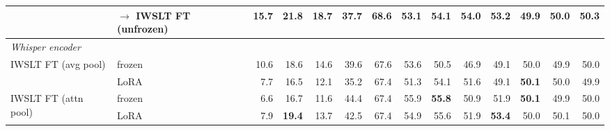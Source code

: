 \begin{table}[t]
\begin{tabular}{p{3cm}l|rrr|rrr|rrr|rrr}
 & \quad $\to$ IWSLT FT (unfrozen) & \cellcolor[RGB]{194,229,228}15.7 & \cellcolor[RGB]{191,227,227}21.8 & \cellcolor[RGB]{195,229,228}18.7 & \cellcolor[RGB]{218,239,239}37.7 & \cellcolor[RGB]{224,242,241}68.6 & \cellcolor[RGB]{225,242,242}53.1 & \cellcolor[RGB]{251,209,176}54.1 & \cellcolor[RGB]{250,183,132}\textbf{54.0} & \cellcolor[RGB]{251,205,169}53.2 & \cellcolor[RGB]{255,255,255}49.9 & \cellcolor[RGB]{255,255,255}50.0 & \cellcolor[RGB]{232,168,205}\textbf{50.3} \\
\midrule
\multicolumn{14}{l}{\textit{Whisper encoder}} \\
\midrule
\multirow{2}{*}{\parbox[t]{3cm}{\raggedright IWSLT FT (avg pool)}} & frozen & \cellcolor[RGB]{228,243,243}10.6 & \cellcolor[RGB]{214,237,237}18.6 & \cellcolor[RGB]{230,244,244}14.6 & \cellcolor[RGB]{213,237,236}39.6 & \cellcolor[RGB]{228,243,243}67.6 & \cellcolor[RGB]{222,241,240}53.6 & \cellcolor[RGB]{254,249,245}50.5 & \cellcolor[RGB]{255,255,255}46.9 & \cellcolor[RGB]{255,255,255}49.1 & \cellcolor[RGB]{255,255,255}50.0 & \cellcolor[RGB]{255,255,255}49.9 & \cellcolor[RGB]{255,255,255}50.0 \\
 & LoRA & \cellcolor[RGB]{247,251,251}7.7 & \cellcolor[RGB]{230,244,244}16.5 & \cellcolor[RGB]{251,253,253}12.1 & \cellcolor[RGB]{224,242,241}35.2 & \cellcolor[RGB]{228,243,243}67.4 & \cellcolor[RGB]{235,246,246}51.3 & \cellcolor[RGB]{251,209,176}54.1 & \cellcolor[RGB]{253,226,205}51.6 & \cellcolor[RGB]{255,255,255}49.1 & \cellcolor[RGB]{232,168,205}\textbf{50.1} & \cellcolor[RGB]{255,255,255}50.0 & \cellcolor[RGB]{255,255,255}49.9 \\
\multirow{2}{*}{\parbox[t]{3cm}{\raggedright IWSLT FT (attn pool)}} & frozen & \cellcolor[RGB]{255,255,255}6.6 & \cellcolor[RGB]{228,243,243}16.7 & \cellcolor[RGB]{255,255,255}11.6 & \cellcolor[RGB]{200,231,231}44.4 & \cellcolor[RGB]{228,243,243}67.4 & \cellcolor[RGB]{210,235,235}55.9 & \cellcolor[RGB]{250,190,143}\textbf{55.8} & \cellcolor[RGB]{253,238,227}50.9 & \cellcolor[RGB]{253,225,204}51.9 & \cellcolor[RGB]{232,168,205}\textbf{50.1} & \cellcolor[RGB]{255,255,255}49.9 & \cellcolor[RGB]{255,255,255}50.0 \\
 & LoRA & \cellcolor[RGB]{245,251,251}7.9 & \cellcolor[RGB]{208,235,234}\textbf{19.4} & \cellcolor[RGB]{237,247,247}13.7 & \cellcolor[RGB]{205,233,233}42.5 & \cellcolor[RGB]{228,243,243}67.4 & \cellcolor[RGB]{215,238,237}54.9 & \cellcolor[RGB]{250,192,147}55.6 & \cellcolor[RGB]{252,221,196}51.9 & \cellcolor[RGB]{251,202,164}\textbf{53.4} & \cellcolor[RGB]{255,255,255}50.0 & \cellcolor[RGB]{243,211,230}50.1 & \cellcolor[RGB]{255,255,255}50.0 \\

\end{tabular}
\end{table}
